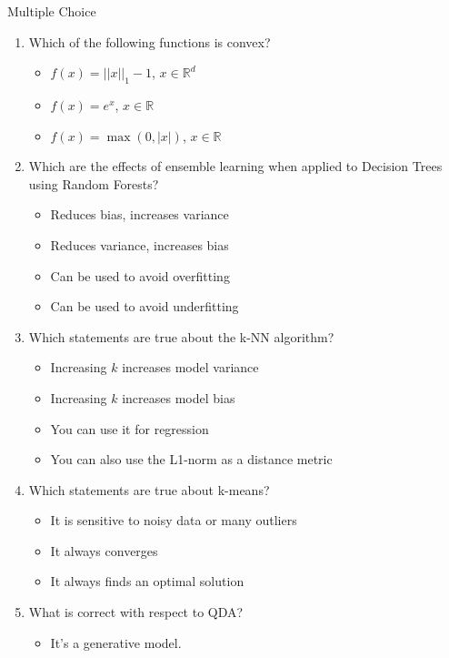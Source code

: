 \documentclass{article}
\author{Leopold Lemmermann}
\begin{document}
\createtitle


\begin{exercise}{Multiple Choice}
  \begin{enumerate}
    \item Which of the following functions is convex?
      \begin{itemize}
        \item $f(x) = ||x||_1 - 1$, $x \in \mathbb{R}^d$
        \item $f(x) = e^x$, $x \in \mathbb{R}$
        \item $f(x) = \max(0, |x|)$, $x \in \mathbb{R}$
      \end{itemize}
    \item Which are the effects of ensemble learning when applied to Decision Trees using Random Forests?
      \begin{itemize}
        \item Reduces bias, increases variance
        \item Reduces variance, increases bias
        \item Can be used to avoid overfitting
        \item Can be used to avoid underfitting
      \end{itemize}
    \item Which statements are true about the k-NN algorithm?
      \begin{itemize}
        \item Increasing $k$ increases model variance
        \item Increasing $k$ increases model bias
        \item You can use it for regression
        \item You can also use the L1-norm as a distance metric
      \end{itemize}
    \item Which statements are true about k-means?
      \begin{itemize}
        \item It is sensitive to noisy data or many outliers
        \item It always converges
        \item It always finds an optimal solution
      \end{itemize}
    \item What is correct with respect to QDA?
      \begin{itemize}
        \item It's a generative model.

\end{itemize}
\end{enumerate}
\end{exercise}
\end{document}
